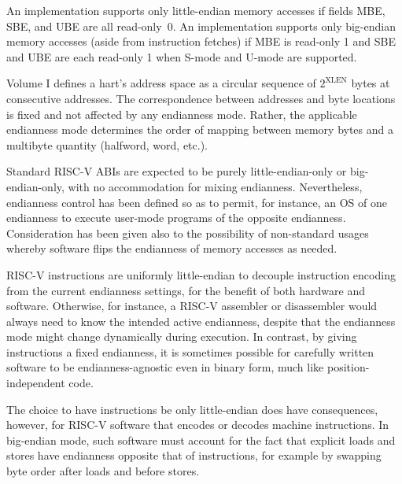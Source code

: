 \begin{commentary}
An implementation supports only little-endian memory accesses if fields
MBE, SBE, and UBE are all read-only~0.
An implementation supports only big-endian memory accesses (aside from
instruction fetches) if MBE is read-only 1 and SBE and UBE are each
read-only 1 when S-mode and U-mode are supported.
\end{commentary}

\begin{commentary}
Volume I defines a hart's address space as a circular sequence of
$2^{\text{XLEN}}$ bytes at consecutive addresses.
The correspondence between addresses and byte locations is fixed and not
affected by any endianness mode.
Rather, the applicable endianness mode determines the order of mapping
between memory bytes and a multibyte quantity (halfword, word, etc.).
\end{commentary}

\begin{commentary}
Standard RISC-V ABIs are expected to be purely little-endian-only or
big-endian-only, with no accommodation for mixing endianness.
Nevertheless, endianness control has been defined so as to permit, for
instance, an OS of one endianness to execute user-mode programs of the
opposite endianness.
Consideration has been given also to the possibility of non-standard
usages whereby software flips the endianness of memory accesses as
needed.
\end{commentary}

\begin{commentary}
RISC-V instructions are uniformly little-endian to decouple instruction
encoding from the current endianness settings, for the benefit of both
hardware and software.
Otherwise, for instance, a RISC-V assembler or disassembler would always
need to know the intended active endianness, despite that the endianness
mode might change dynamically during execution.
In contrast, by giving instructions a fixed endianness, it is sometimes
possible for carefully written software to be endianness-agnostic even in
binary form, much like position-independent code.

The choice to have instructions be only little-endian does have
consequences, however, for RISC-V software that encodes or decodes
machine instructions.
In big-endian mode, such software must account for the fact that explicit
loads and stores have endianness opposite that of instructions, for
example by swapping byte order after loads and before stores.
\end{commentary}

